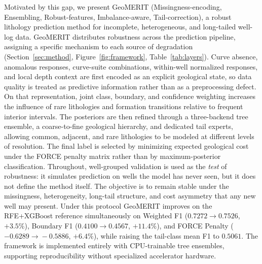 \documentclass[bdcc,article,submit,pdftex,moreauthors]{Definitions/mdpi}
\begin{document}
Motivated by this gap, we present GeoMERIT (Missingness-encoding, Ensembling,
Robust-features, Imbalance-aware, Tail-correction), a robust lithology prediction method for
incomplete, heterogeneous, and long-tailed well-log data. GeoMERIT distributes robustness
across the prediction pipeline, assigning a specific mechanism to each source of degradation
(Section~\ref{sec:method}, Figure~\ref{fig:framework}, Table~\ref{tab:layers}). Curve absence,
anomalous responses, curve-suite combinations, within-well normalized responses, and local
depth context are first encoded as an explicit geological state, so data quality is treated as
predictive information rather than as a preprocessing defect. On that representation, joint
class, boundary, and confidence weighting increases the influence of rare lithologies and
formation transitions relative to frequent interior intervals. The posteriors are then refined
through a three-backend tree ensemble, a coarse-to-fine geological hierarchy, and dedicated tail
experts, allowing common, adjacent, and rare lithologies to be modeled at different levels of
resolution. The final label is selected by minimizing expected geological cost under the FORCE
penalty matrix rather than by maximum-posterior classification. Throughout, well-grouped
validation is used as the \emph{test} of robustness: it simulates prediction on wells the model
has never seen, but it does not define the method itself. The objective is to remain stable
under the missingness, heterogeneity, long-tail structure, and cost asymmetry that any new well
may present. Under this protocol GeoMERIT improves on the RFE+XGBoost reference
simultaneously on Weighted F1 ($0.7272\!\to\!0.7526$, $+3.5\%$), Boundary F1
($0.4100\!\to\!0.4567$, $+11.4\%$), and FORCE Penalty ($-0.6289\!\to\!-0.5886$, $+6.4\%$),
while raising the tail-class mean F1 to $0.5061$. The framework is implemented entirely with
CPU-trainable tree ensembles, supporting reproducibility without specialized accelerator
hardware.
\end{document}
